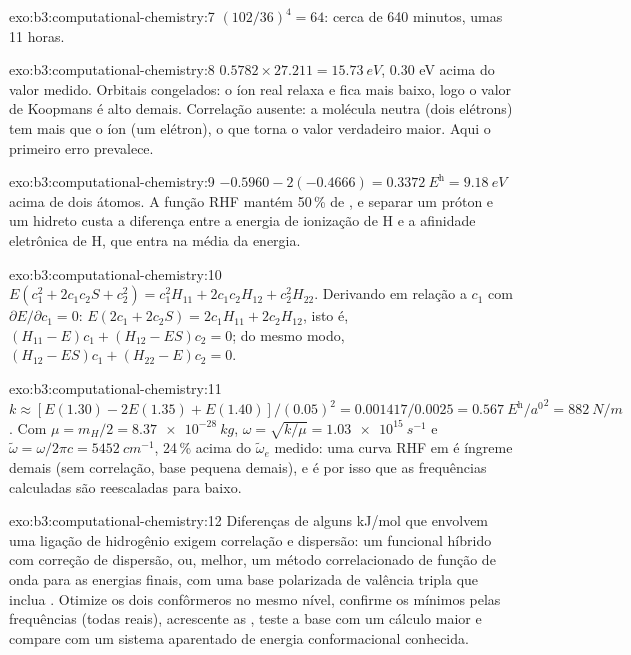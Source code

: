 \begin{solution}{exo:b3:computational-chemistry:7}
$(102/36)^4 = 64$: cerca de 640 minutos, umas 11 horas.
\end{solution}

\begin{solution}{exo:b3:computational-chemistry:8}
$0.5782 \times 27.211 = \qty{15.73}{eV}$, 0.30 eV acima do valor medido. Orbitais
congelados: o íon real relaxa e fica mais baixo, logo o valor de Koopmans é alto
demais. Correlação ausente: a molécula neutra (dois elétrons) tem mais  que o íon (um elétron), o que torna o valor verdadeiro maior.
Aqui o primeiro erro prevalece.
\end{solution}

\begin{solution}{exo:b3:computational-chemistry:9}
$-0.5960 - 2(-0.4666) = \qty{0.3372}{\hartree} = \qty{9.18}{eV}$ acima de dois átomos.
A função RHF mantém 50\,\% de , e separar um próton e um hidreto
custa a diferença entre a energia de ionização de H e a afinidade eletrônica
de H, que entra na média da energia.
\end{solution}

\begin{solution}{exo:b3:computational-chemistry:10}
$E(c_1^2 + 2c_1c_2S + c_2^2) = c_1^2H_{11} + 2c_1c_2H_{12} + c_2^2H_{22}$.
Derivando em relação a $c_1$ com $\partial E/\partial c_1 = 0$:
$E(2c_1 + 2c_2S) = 2c_1H_{11} + 2c_2H_{12}$, isto é, $(H_{11} - E)c_1 + (H_{12} -
ES)c_2 = 0$; do mesmo modo, $(H_{12} - ES)c_1 + (H_{22} - E)c_2 = 0$.
\end{solution}

\begin{solution}{exo:b3:computational-chemistry:11}
$k \approx [E(1.30) - 2E(1.35) + E(1.40)]/(0.05)^2 = 0.001417/0.0025 =
\qty{0.567}{\hartree\per\bohr\squared} = \qty{882}{N/m}$. Com $\mu = m_H/2 =
\qty{8.37e-28}{kg}$, $\omega = \sqrt{k/\mu} = \qty{1.03e15}{s^{-1}}$ e
$\tilde\omega = \omega/2\pi c = \qty{5452}{cm^{-1}}$, 24\,\% acima do
$\tilde\omega_e$ medido: uma curva RHF em  é íngreme demais (sem
correlação, base pequena demais), e é por isso que as frequências calculadas
são reescaladas para baixo.
\end{solution}

\begin{solution}{exo:b3:computational-chemistry:12}
Diferenças de alguns \unit{kJ/mol} que envolvem uma ligação de hidrogênio exigem
correlação e dispersão: um funcional híbrido com correção de dispersão, ou,
melhor, um método correlacionado de função de onda para as energias finais,
com uma base polarizada de valência tripla que inclua . Otimize
os dois confôrmeros no mesmo nível, confirme os mínimos pelas frequências
(todas reais), acrescente as , teste a base com um
cálculo maior e compare com um sistema aparentado de energia conformacional conhecida.
\end{solution}

